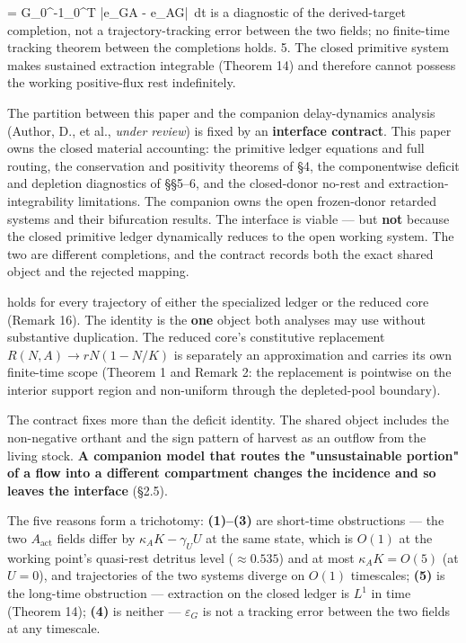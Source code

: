 \documentclass[11pt]{article}
\begin{document}
=\allowbreak{} G_0^{-1}\int_0^T |e_{GA} - e_{AG}|\,\allowbreak{} dt\) is a diagnostic of the derived-target completion, not a trajectory-tracking error between the two fields; no finite-time tracking theorem between the completions holds. 5. The closed primitive system makes sustained extraction integrable (Theorem 14) and therefore cannot possess the working positive-flux rest indefinitely.

The partition between this paper and the companion delay-dynamics analysis (Author, D., et al., \emph{under review}) is fixed by an \textbf{interface contract}. This paper owns the closed material accounting: the primitive ledger equations and full routing, the conservation and positivity theorems of \S4, the componentwise deficit and depletion diagnostics of \S\S5--6, and the closed-donor no-rest and extraction-integrability limitations. The companion owns the open frozen-donor retarded systems and their bifurcation results. The interface is viable --- but \textbf{not} because the closed primitive ledger dynamically reduces to the open working system. The two are different completions, and the contract records both the exact shared object and the rejected mapping.

holds for every trajectory of either the specialized ledger or the reduced core (Remark 16). The identity is the \textbf{one} object both analyses may use without substantive duplication. The reduced core's constitutive replacement \(R(N,\allowbreak{}A)\to rN(1-N/\allowbreak{}K)\) is separately an approximation and carries its own finite-time scope (Theorem 1 and Remark 2: the replacement is pointwise on the interior support region and non-uniform through the depleted-pool boundary).

The contract fixes more than the deficit identity. The shared object includes the non-negative orthant and the sign pattern of harvest as an outflow from the living stock. \textbf{A companion model that routes the "unsustainable portion" of a flow into a different compartment changes the incidence and so leaves the interface} (\S2.5).

The five reasons form a trichotomy: \textbf{(1)--(3)} are short-time obstructions --- the two \(A_{\mathrm{act}}\) fields differ by \(\kappa_AK-\gamma_UU\) at the same state, which is \(O(1)\) at the working point's quasi-rest detritus level (\(\approx0.535\)) and at most \(\kappa_AK=O(5)\) (at \(U=0\)), and trajectories of the two systems diverge on \(O(1)\) timescales; \textbf{(5)} is the long-time obstruction --- extraction on the closed ledger is \(L^1\) in time (Theorem 14); \textbf{(4)} is neither --- \(\varepsilon_G\) is not a tracking error between the two fields at any timescale.
\end{document}
